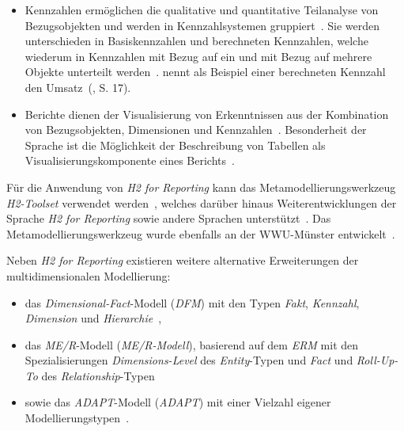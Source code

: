\documentclass[
  language=german, %
  type=bachelor,%
  ngerman
]{isthesis}
\begin{document}
\begin{content}
\begin{itemize}
		\item Kennzahlen ermöglichen die qualitative und quantitative Teilanalyse
		von Bezugsobjekten und werden in Kennzahlsystemen
		gruppiert~\cite[][S.88]{becker2012fachkonzeptionelle}. Sie werden
		unterschieden in Basiskennzahlen und berechneten Kennzahlen, welche
		wiederum in Kennzahlen mit Bezug auf ein und mit Bezug auf mehrere Objekte
		unterteilt werden~\cite[][S.  15]{becker2007h2}.
		\textsc{\citeauthor{becker2007h2}} nennt als Beispiel einer berechneten
		Kennzahl den Umsatz~(\cite{becker2007h2}, S. 17).

		\item Berichte dienen der Visualisierung von Erkenntnissen aus der
		Kombination von Bezugsobjekten, Dimensionen und Kennzahlen~\cite[][S.
		23]{becker2007h2}. Besonderheit der Sprache ist die Möglichkeit der
		Beschreibung von Tabellen als Visualisierungskomponente eines
		Berichts~\cite[][S. 86]{becker2012fachkonzeptionelle}.

	\end{itemize}

	Für die Anwendung von \textit{H2 for Reporting} kann das
	Metamodellierungswerkzeug \textit{H2-Toolset} verwendet werden~\cite[][S.
	33]{fleischer2013konstruktion}, welches darüber hinaus Weiterentwicklungen
	der Sprache \textit{H2 for Reporting} sowie andere Sprachen
	unterstützt~\cite[][S. 86]{becker2012fachkonzeptionelle}. Das
	Metamodellierungswerkzeug wurde ebenfalls an der \acrshort{WWU}-Münster
	entwickelt~\cite[][S.  34]{becker2007h2}.

  Neben \textit{H2 for Reporting} existieren weitere alternative Erweiterungen der multidimensionalen Modellierung:

  \begin{itemize}
    \item das \textit{Dimensional-Fact}-Modell (\textit{\acrshort{DFM}}) mit den Typen
      \textit{Fakt}, \textit{Kennzahl}, \textit{Dimension} und
      \textit{Hierarchie}~\cite[][]{golfarelli1998dimensional}, 
    \item das \textit{\acrlong{ME/R}}-Modell (\textit{\acrshort{ME/R}-Modell}), basierend
      auf dem \textit{\acrlong{ERM}} mit den Spezialisierungen
      \textit{Dimensions-Level} des \textit{Entity}-Typen und \textit{Fact} und
      \textit{Roll-Up-To} des
      \textit{Relationship}-Typen~\cite[][]{sapia1998extending}
    \item sowie das
      \textit{\acrlong{ADAPT}}-Modell (\textit{\acrshort{ADAPT}}) mit einer
      Vielzahl eigener Modellierungstypen~\cite[][]{chamoni2013analytische}.
  \end{itemize}


\end{content}
\end{document}
